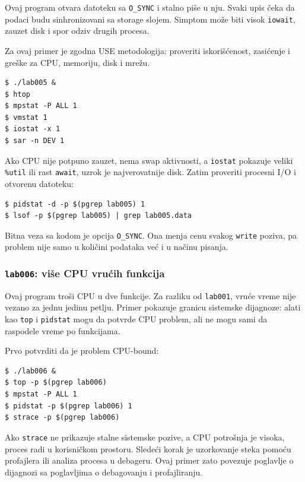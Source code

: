 Ovaj program otvara datoteku sa \texttt{O\_SYNC} i stalno piše u nju. Svaki upis čeka da podaci budu sinhronizovani sa storage slojem. Simptom može biti visok \texttt{iowait}, zauzet disk i spor odziv drugih procesa.


Za ovaj primer je zgodna USE metodologija: proveriti iskorišćenost, zasićenje i greške za CPU, memoriju, disk i mrežu.

\begin{verbatim}
$ ./lab005 &
$ htop
$ mpstat -P ALL 1
$ vmstat 1
$ iostat -x 1
$ sar -n DEV 1
\end{verbatim}

Ako CPU nije potpuno zauzet, nema swap aktivnosti, a \texttt{iostat} pokazuje veliki \texttt{\%util} ili rast \texttt{await}, uzrok je najverovatnije disk. Zatim proveriti procesni I/O i otvorenu datoteku:

\begin{verbatim}
$ pidstat -d -p $(pgrep lab005) 1
$ lsof -p $(pgrep lab005) | grep lab005.data
\end{verbatim}

Bitna veza sa kodom je opcija \texttt{O\_SYNC}. Ona menja cenu svakog \texttt{write} poziva, pa problem nije samo u količini podataka već i u načinu pisanja.

\subsubsection{\texorpdfstring{\texttt{lab006}: više CPU vrućih funkcija}{lab006: više CPU vrućih funkcija}}\label{lab006-cpu-vise-funkcija}

Ovaj program troši CPU u dve funkcije. Za razliku od \texttt{lab001}, vruće vreme nije vezano za jednu jedinu petlju. Primer pokazuje granicu sistemske dijagnoze: alati kao \texttt{top} i \texttt{pidstat} mogu da potvrde CPU problem, ali ne mogu sami da raspodele vreme po funkcijama.


Prvo potvrditi da je problem CPU-bound:

\begin{verbatim}
$ ./lab006 &
$ top -p $(pgrep lab006)
$ mpstat -P ALL 1
$ pidstat -p $(pgrep lab006) 1
$ strace -p $(pgrep lab006)
\end{verbatim}

Ako \texttt{strace} ne prikazuje stalne sistemske pozive, a CPU potrošnja je visoka, proces radi u korisničkom prostoru. Sledeći korak je uzorkovanje steka pomoću profajlera ili analiza procesa u debageru. Ovaj primer zato povezuje poglavlje o dijagnozi sa poglavljima o debagovanju i profajliranju.

